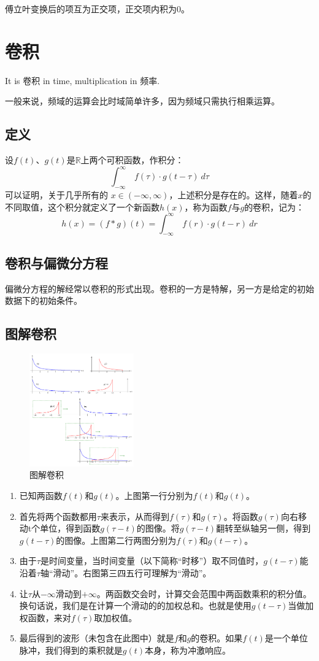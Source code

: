 傅立叶变换后的项互为正交项，正交项内积为$0$。
\section{卷积}
It is 卷积 in time, multiplication in 频率.

一般来说，频域的运算会比时域简单许多，因为频域只需执行相乘运算。
\subsection{定义}
设$f(t)$、$g(t)$是$\mathbb{R}$上两个可积函数，作积分：
$$
	\int_{-\infty}^\infty\ f(\tau)\cdot g(t-\tau)\ d\tau
$$
可以证明，关于几乎所有的 $x\in (-\infty ,\infty )$，上述积分是存在的。这样，随着$x$的不同取值，这个积分就定义了一个新函数$h(x)$，称为函数$f$与$g$的卷积，记为：
$$
	h(x)=(f*g)(t)=\int_{-\infty}^{\infty}\ f(r)\cdot g(t-r)\ dr
$$
\subsection{卷积与偏微分方程}
偏微分方程的解经常以卷积的形式出现。卷积的一方是特解，另一方是给定的初始数据下的初始条件。
\subsection{图解卷积}
\begin{figure}[H]
	\centering
	\includegraphics[width=0.4\textwidth]{assets/Convolution.png}
	\caption{图解卷积}
\end{figure}

\begin{enumerate}
	\item 已知两函数$f(t)$和$g(t)$。上图第一行分别为$f(t)$和$g(t)$。
	\item 首先将两个函数都用$\tau$来表示，从而得到$f(\tau)$和$g(\tau)$。将函数$g(\tau)$向右移动t个单位，得到函数$g(\tau-t)$的图像。将$g(\tau-t)$翻转至纵轴另一侧，得到$g(t-\tau)$的图像。上图第二行两图分别为$f(\tau)$和$g(t-\tau)$。
	\item 由于$\tau$是时间变量，当时间变量（以下简称“时移”）取不同值时，$g(t-\tau)$能沿着$\tau$轴“滑动”。右图第三四五行可理解为“滑动”。
	\item 让$\tau$从$-∞$滑动到$+∞$。两函数交会时，计算交会范围中两函数乘积的积分值。换句话说，我们是在计算一个滑动的的加权总和。也就是使用$g(t-\tau )$当做加权函数，来对$f(\tau)$取加权值。
	\item 最后得到的波形（未包含在此图中）就是$f$和$g$的卷积。如果$f(t)$是一个单位脉冲，我们得到的乘积就是$g(t)$本身，称为冲激响应。
\end{enumerate}